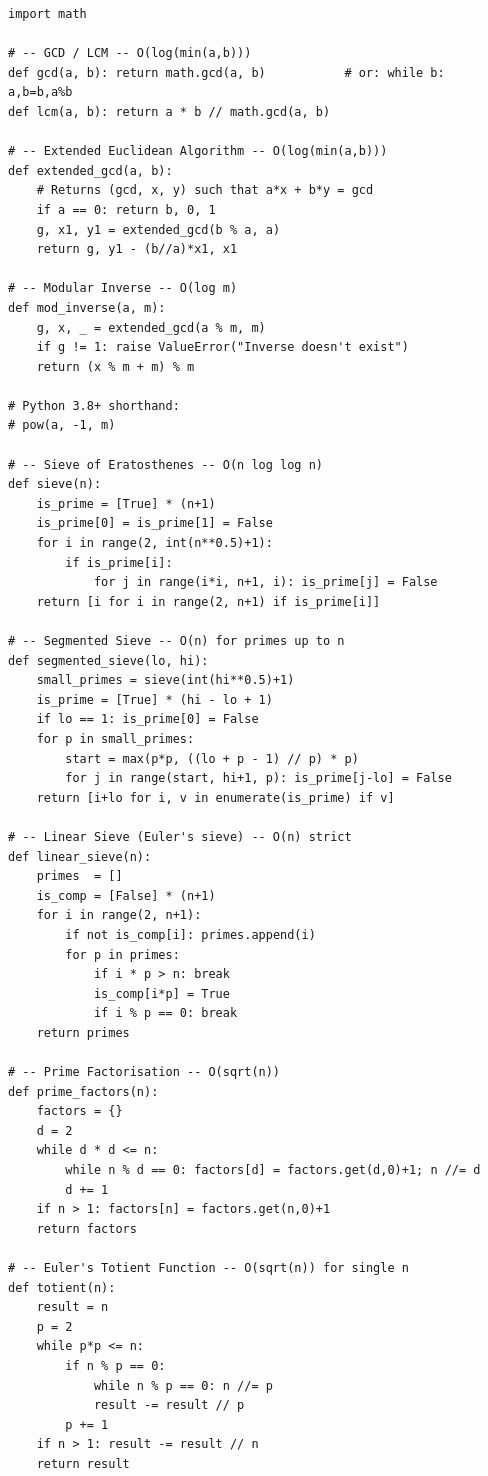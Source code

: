\documentclass[11pt,a4paper]{report}
\begin{document}
\begin{lstlisting}
import math

# -- GCD / LCM -- O(log(min(a,b)))
def gcd(a, b): return math.gcd(a, b)           # or: while b: a,b=b,a%b
def lcm(a, b): return a * b // math.gcd(a, b)

# -- Extended Euclidean Algorithm -- O(log(min(a,b)))
def extended_gcd(a, b):
    # Returns (gcd, x, y) such that a*x + b*y = gcd
    if a == 0: return b, 0, 1
    g, x1, y1 = extended_gcd(b % a, a)
    return g, y1 - (b//a)*x1, x1

# -- Modular Inverse -- O(log m)
def mod_inverse(a, m):
    g, x, _ = extended_gcd(a % m, m)
    if g != 1: raise ValueError("Inverse doesn't exist")
    return (x % m + m) % m

# Python 3.8+ shorthand:
# pow(a, -1, m)

# -- Sieve of Eratosthenes -- O(n log log n)
def sieve(n):
    is_prime = [True] * (n+1)
    is_prime[0] = is_prime[1] = False
    for i in range(2, int(n**0.5)+1):
        if is_prime[i]:
            for j in range(i*i, n+1, i): is_prime[j] = False
    return [i for i in range(2, n+1) if is_prime[i]]

# -- Segmented Sieve -- O(n) for primes up to n
def segmented_sieve(lo, hi):
    small_primes = sieve(int(hi**0.5)+1)
    is_prime = [True] * (hi - lo + 1)
    if lo == 1: is_prime[0] = False
    for p in small_primes:
        start = max(p*p, ((lo + p - 1) // p) * p)
        for j in range(start, hi+1, p): is_prime[j-lo] = False
    return [i+lo for i, v in enumerate(is_prime) if v]

# -- Linear Sieve (Euler's sieve) -- O(n) strict
def linear_sieve(n):
    primes  = []
    is_comp = [False] * (n+1)
    for i in range(2, n+1):
        if not is_comp[i]: primes.append(i)
        for p in primes:
            if i * p > n: break
            is_comp[i*p] = True
            if i % p == 0: break
    return primes

# -- Prime Factorisation -- O(sqrt(n))
def prime_factors(n):
    factors = {}
    d = 2
    while d * d <= n:
        while n % d == 0: factors[d] = factors.get(d,0)+1; n //= d
        d += 1
    if n > 1: factors[n] = factors.get(n,0)+1
    return factors

# -- Euler's Totient Function -- O(sqrt(n)) for single n
def totient(n):
    result = n
    p = 2
    while p*p <= n:
        if n % p == 0:
            while n % p == 0: n //= p
            result -= result // p
        p += 1
    if n > 1: result -= result // n
    return result


\end{lstlisting}
\end{document}
